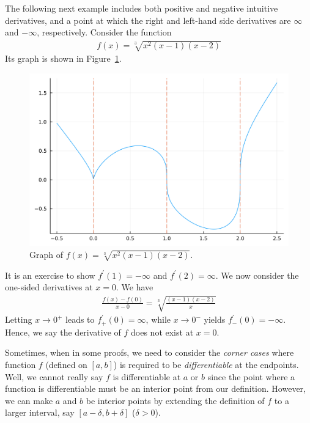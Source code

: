 \documentclass[thmcnt=section, 12pt]{my-elegantbook}
\begin{document}
\begin{example}
    The following next example includes both positive and negative intuitive derivatives, and a point at which the right and left-hand side derivatives are $\infty$ and $-\infty$, respectively. Consider the function
    \begin{align*}
        f(x) = \sqrt[3]{x^2 (x-1) (x-2)}
    \end{align*}
    Its graph is shown in Figure~\ref{fig:3}.

    \begin{figure}[ht]
        \centering
        \includegraphics[scale=0.2]{figures/graph-003.png}
        \caption{Graph of $f(x) = \sqrt[3]{x^2 (x-1) (x-2)}$.}
        \label{fig:3}
    \end{figure}

    It is an exercise to show $f^\prime(1) = -\infty$ and $f^\prime(2) = \infty$. We now consider the one-sided derivatives at $x = 0$. We have
    \begin{align*}
        \frac{f(x) - f(0)}{x - 0}
        = \sqrt[3]{\frac{(x-1)(x-2)}{x}}
    \end{align*}
    Letting $x \to 0^{+}$ leads to $f^\prime_{+}(0) = \infty$, while $x \to 0^{-}$ yields $f^\prime_{-}(0) = -\infty$. Hence, we say the derivative of $f$ does not exist at $x = 0$.
    \label{eg:2}
\end{example}


Sometimes, when in some proofs,
we need to consider the \textit{corner cases}
where function $f$ (defined on $[a, b]$)
is required to be \textit{differentiable}
at the endpoints.
Well, we cannot really say $f$ is differentiable
at $a$ or $b$ since
the point where a function is differentiable must
be an interior point from our definition.
However, we can make $a$ and $b$ be interior points
by extending the definition of $f$ to a larger
interval, say $[a-\delta, b+\delta]$ ($\delta > 0$).
\end{document}
